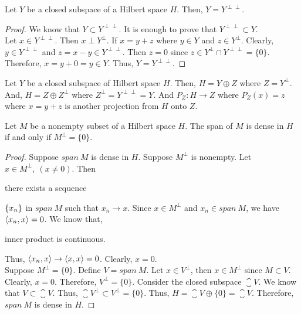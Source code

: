 \begin{lemma}
	Let $Y$ be a closed subspace of a Hilbert space $H$.
	Then, $Y = Y^{\perp\perp}$.
\end{lemma}
\begin{proof}
	We know that $Y \subset Y^{\perp\perp}$.
	It is enough to prove that $Y^{\perp\perp} \subset Y$.\\
	Let $x \in Y^{\perp\perp}$.
	Then $x \perp Y^\perp$.
	If $x = y+z$ where $y \in Y$ and $z \in Y^\perp$.
	Clearly, $y \in Y^{\perp\perp}$ and $z = x-y \in Y^{\perp\perp}$.
	Then $z = 0$ since $z \in Y^\perp \cap Y^{\perp\perp} = \{ 0 \}$.
	Therefore, $x = y + 0 = y \in Y$.
	Thus, $Y = Y^{\perp\perp}$.
\end{proof}

\begin{remark}
	Let $Y$ be a closed subspace of Hilbert space $H$.
	Then, $H = Y \oplus Z$ where $Z = Y^\perp$.
	And, $H = Z \oplus Z^\perp$ where $Z^\perp = Y^{\perp\perp} = Y$.
	And $P_Z : H \to Z$ where $P_Z(x) = z$ where $x = y+z$ is another projection from $H$ onto $Z$.
\end{remark}

\begin{lemma}[dense]
	Let $M$ be a nonempty subset of a Hilbert space $H$.
	The span of $M$ is dense in $H$ if and only if $M^\perp = \{ 0 \}$.
\end{lemma}
\begin{proof}
	Suppose $span\ M$ is dense in $H$.
	Suppose $M^\perp$ is nonempty.
	Let $x \in M^\perp,\ (x \ne 0)$.
	Then \begin{important}there exists a sequence\end{important} $\left\{x_n\right\}$ in $span\ M$ such that $x_n \to x$.
	Since $x \in M^\perp$ and $x_n \in span\ M$, we have $\left\langle x_n,x \right\rangle = 0$.
	We know that, \begin{important}inner product is continuous.\end{important}
	Thus, $\left\langle x_n,x \right\rangle \to \left\langle x,x \right\rangle = 0$.
	Clearly, $x = 0$.\\

	Suppose $M^\perp = \{ 0 \}$.
	Define $V = span\ M$.
	Let $x \in V^\perp$, then $x \in M^\perp$ since $M \subset V$.
	Clearly, $x = 0$.
	Therefore, $V^\perp = \{ 0 \}$.
	Consider the closed subspace $\closure{V}$.
	We know that $V \subset \closure{V}$.
	Thus, $\closure{V}^\perp \subset V^\perp = \{ 0 \}$.
	Thus, $H = \closure{V} \oplus \{ 0 \} = \closure{V}$.
	Therefore, $span\ M$ is dense in $H$.
\end{proof}

